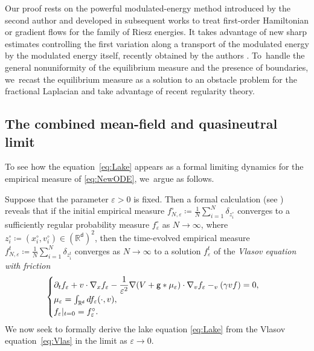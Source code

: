 \documentclass[JEP,XML,SOM,Unicode,published]{cedram}
\theoremstyle{plain}
\theoremstyle{definition}
\let\div\relax
\DeclareMathOperator{\div}{\mathrm{div}}
\newcommand{\R}{{\mathbb{R}}}
\let\ga\gamma
\let\vep\varepsilon
\let\p\partial
\renewcommand{\d}{\mathsf{d}}
\newcommand{\g}{{\mathsf{g}}}
\begin{document}
Our proof rests on the powerful modulated-energy method introduced by the second author \cite{Serfaty2017} and developed in subsequent works \cite{Duerinckx2016, Serfaty2020,BJW2019edp, NRS2021} to treat first-order Hamiltonian or gradient flows for the family of Riesz energies. It takes advantage of new sharp estimates controlling the first variation along a transport of the modulated energy by the modulated energy itself, recently obtained by the authors \cite{RS2022}. To~handle the general nonuniformity of the equilibrium measure and the presence of boundaries, we~recast the equilibrium measure as a solution to an obstacle problem for the fractional Laplacian and take advantage of recent regularity theory.

\subsection{The combined mean-field and quasineutral limit}\label{ssec:introMFQN}
To see how the equation~\eqref{eq:Lake} appears as a formal limiting dynamics for the empirical measure of \eqref{eq:NewODE}, we~argue as follows.

Suppose that the parameter $\vep>0$ is fixed. Then a formal calculation (\eg see \cite{Jabin2014}) reveals that if the initial empirical measure $f_{N,\vep}^\circ \coloneqq \frac1N\sum_{i=1}^N \delta_{z_i^\circ}$ converges to a sufficiently regular probability measure $f_{\vep}^\circ$ as $N\to\infty$, where $z_i^\circ\coloneqq (x_i^\circ,v_i^\circ) \in (\R^\d)^2$, then the time-evolved empirical measure $f_{N,\vep}^t \coloneqq \frac{1}{N}\sum_{i=1}^N \delta_{z_i^t}$ converges as $N\to\infty$ to a solution $f_\vep^t$ of the \emph{Vlasov equation with friction}
\begin{equation}\label{eq:Vlas}
\begin{cases}
\p_t f_\vep+v\cdot\nabla_x f_\vep-\dfrac{1}{\vep^2}\nabla(V+\g\ast\mu_\vep)\cdot\nabla_v f_\vep - \div_v(\ga vf)=0,\\
\mu_\vep = \int_{\R^\d}df_\vep(\cdot,v), \\
f_\vep|_{t=0} = f_\vep^\circ.
\end{cases}
\end{equation}
We now seek to {formally} derive the lake equation \eqref{eq:Lake} from the Vlasov equation~\eqref{eq:Vlas} in the limit as $\vep\to0$.
\end{document}
